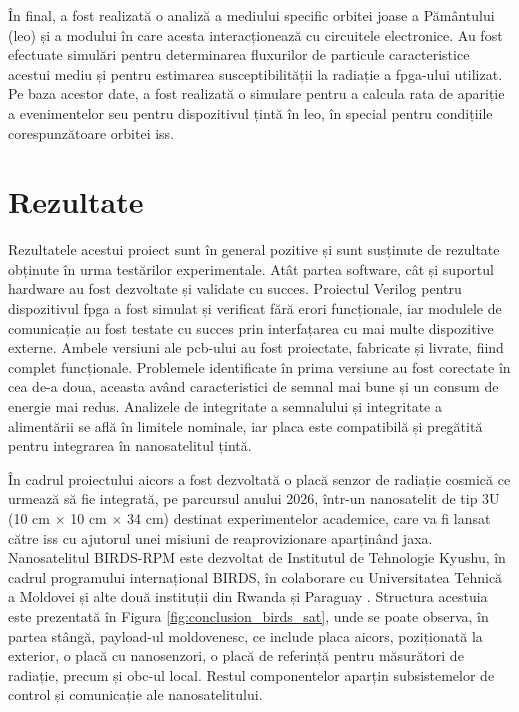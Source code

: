 \documentclass[12pt,a4paper]{report}
\begin{document}
În final, a fost realizată o analiză a mediului specific orbitei joase a Pământului (\gls{leo}) și a modului în care acesta interacționează cu circuitele electronice. Au fost efectuate simulări pentru determinarea fluxurilor de particule caracteristice acestui mediu și pentru estimarea susceptibilității la radiație a \gls{fpga}-ului utilizat. Pe baza acestor date, a fost realizată o simulare pentru a calcula rata de apariție a evenimentelor \gls{seu} pentru dispozitivul țintă în \gls{leo}, în special pentru condițiile corespunzătoare orbitei \gls{iss}.

\section{Rezultate}
Rezultatele acestui proiect sunt în general pozitive și sunt susținute de rezultate obținute în urma testărilor experimentale. Atât partea software, cât și suportul hardware au fost dezvoltate și validate cu succes. Proiectul Verilog pentru dispozitivul \gls{fpga} a fost simulat și verificat fără erori funcționale, iar modulele de comunicație au fost testate cu succes prin interfațarea cu mai multe dispozitive externe. Ambele versiuni ale \gls{pcb}-ului au fost proiectate, fabricate și livrate, fiind complet funcționale. Problemele identificate în prima versiune au fost corectate în cea de-a doua, aceasta având caracteristici de semnal mai bune și un consum de energie mai redus. Analizele de integritate a semnalului și integritate a alimentării se află în limitele nominale, iar placa este compatibilă și pregătită pentru integrarea în nanosatelitul țintă.

În cadrul proiectului \gls{aicors} a fost dezvoltată o placă senzor de radiație cosmică ce urmează să fie integrată,  pe parcursul anului 2026, într-un nanosatelit de tip 3U (10 cm $\times$ 10 cm $\times$ 34 cm) destinat experimentelor academice, care va fi lansat către \gls{iss} cu ajutorul unei misiuni de reaprovizionare aparținând \gls{jaxa}. Nanosatelitul BIRDS-RPM este dezvoltat de Institutul de Tehnologie Kyushu, în cadrul programului internațional BIRDS, în colaborare cu Universitatea Tehnică a Moldovei și alte două instituții din Rwanda și Paraguay \cite{birds_manual}. Structura acestuia este prezentată în Figura \ref{fig:conclusion_birds_sat}, unde se poate observa, în partea stângă, payload-ul moldovenesc, ce include placa \gls{aicors}, poziționată la exterior, o placă cu nanosenzori, o placă de referință pentru măsurători de radiație, precum și \gls{obc}-ul local. Restul componentelor aparțin subsistemelor de control și comunicație ale nanosatelitului.
\end{document}

